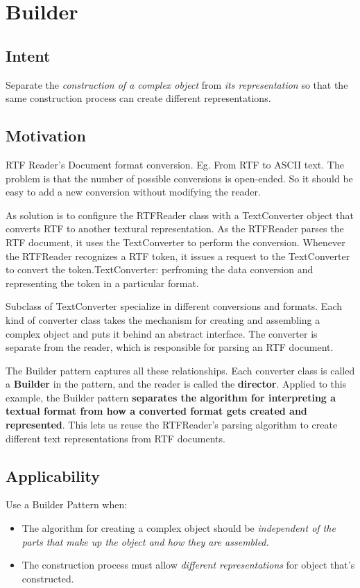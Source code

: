 \documentclass[11pt, a4paper]{book}
\begin{document}
\section{Builder}
\subsection{Intent}
Separate the \emph{construction of a complex object} from \emph{its
representation} so that the same construction process can create 
different representations.
\subsection{Motivation}
RTF Reader's Document format conversion. Eg. From RTF to ASCII text. The problem is that the
number of possible conversions is open-ended. So it should be easy to add a new
conversion without modifying the reader.

As solution is to configure the RTFReader class with a TextConverter object that
converts RTF to another textural representation. As the RTFReader parses the RTF
document, it uses the TextConverter to perform the conversion. Whenever the
RTFReader recognizes a RTF token, it issues a request to the TextConverter to
convert the token.TextConverter: perfroming the data conversion and representing
the token in a particular format.

Subclass of TextConverter specialize in different conversions and formats. Each
kind of converter class takes the mechanism for creating and assembling a
complex object and puts it behind an abstract interface. The converter is
separate from the reader, which is responsible for parsing an RTF document.

The Builder pattern captures all these relationships. Each converter class is
called a \textbf{Builder} in the pattern, and the reader is called the
\textbf{director}. Applied to this example, the Builder pattern \textbf{separates
the algorithm for interpreting a textual format from how a converted format gets
created and represented}. This lets us reuse the RTFReader's parsing algorithm to
create different text representations from RTF documents.

\subsection{Applicability}
Use a Builder Pattern when:
\begin{itemize}
\item The algorithm for creating a complex object should be \emph{independent of
the parts that make up the object and how they are assembled.}
\item The construction process must allow \emph{different representations} for object
that's constructed.
\end{itemize}
\end{document}
